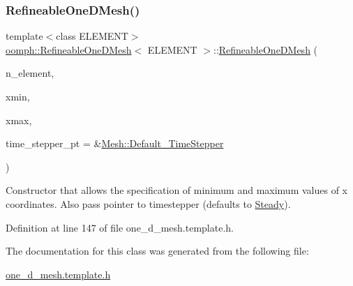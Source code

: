 \subsubsection{\texorpdfstring{Refineable\+One\+D\+Mesh()}{RefineableOneDMesh()}\hspace{0.1cm}{\footnotesize\ttfamily [2/2]}}
{\footnotesize\ttfamily template$<$class E\+L\+E\+M\+E\+NT$>$ \\
\hyperlink{classoomph_1_1RefineableOneDMesh}{oomph\+::\+Refineable\+One\+D\+Mesh}$<$ E\+L\+E\+M\+E\+NT $>$\+::\hyperlink{classoomph_1_1RefineableOneDMesh}{Refineable\+One\+D\+Mesh} (\begin{DoxyParamCaption}\item[{const unsigned \&}]{n\+\_\+element,  }\item[{const double \&}]{xmin,  }\item[{const double \&}]{xmax,  }\item[{\hyperlink{classoomph_1_1TimeStepper}{Time\+Stepper} $\ast$}]{time\+\_\+stepper\+\_\+pt = {\ttfamily \&\hyperlink{classoomph_1_1Mesh_a12243d0fee2b1fcee729ee5a4777ea10}{Mesh\+::\+Default\+\_\+\+Time\+Stepper}} }\end{DoxyParamCaption})\hspace{0.3cm}{\ttfamily [inline]}}



Constructor that allows the specification of minimum and maximum values of x coordinates. Also pass pointer to timestepper (defaults to \hyperlink{classoomph_1_1Steady}{Steady}). 



Definition at line 147 of file one\+\_\+d\+\_\+mesh.\+template.\+h.



The documentation for this class was generated from the following file\+:\begin{DoxyCompactItemize}
\item 
\hyperlink{one__d__mesh_8template_8h}{one\+\_\+d\+\_\+mesh.\+template.\+h}\end{DoxyCompactItemize}
